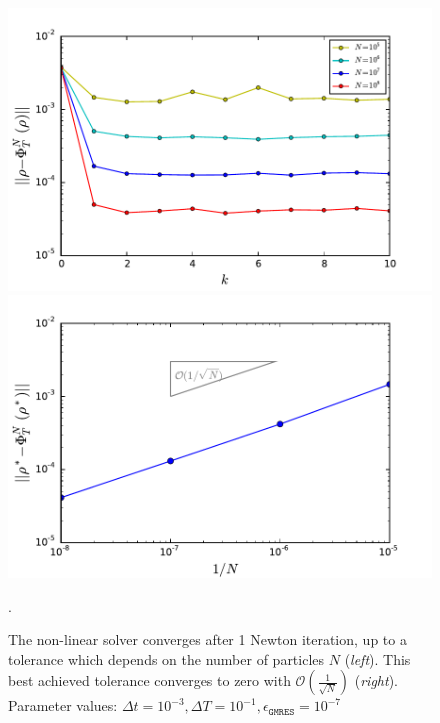 \begin{figure}[H!]
\centering
\includegraphics[width=0.5\linewidth]{../Problems/WeightedParticles/checkSystem/Newton/plots/Newton_sde_res(k)_Dt_e-2_tol1e-7.pdf}
\includegraphics[width=0.49\linewidth]{../Problems/WeightedParticles/checkSystem/Newton/plots/Tolerance_on_NK-solution_converges_N-1_tol_1e-7.pdf}

\caption{ The non-linear solver converges after 1 Newton iteration, up to a tolerance which depends on the number of particles $N$ (\textit{left}). This best achieved tolerance converges to zero with  $\mathcal{O}(\frac{1}{\sqrt{N}})$ (\textit{right}). Parameter values:  $\Delta t = 10^{-3}, \Delta T = 10^{-1} , \epsilon_{\texttt{GMRES}}=10^{-7}$
}.
\label{fig:Newton_sde_res(k)}
\end{figure}


